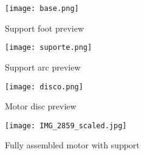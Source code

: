 \begin{figure}[htp]
	\centering
	\texttt{[image: base.png]}
	\caption{Support foot preview}
	\label{fig:support_base}
\end{figure}
\begin{figure}[htp]
	\centering
	\texttt{[image: suporte.png]}
	\caption{Support arc preview}
	\label{fig:support_arc}
\end{figure}
\begin{figure}[htp]
	\centering
	\texttt{[image: disco.png]}
	\caption{Motor disc preview}
	\label{fig:support_disc}
\end{figure}
\begin{figure}[htp]
	\centering
	\texttt{[image: IMG\_2859\_scaled.jpg]}
	\caption{Fully assembled motor with support}
	\label{fig:final_motor_stage}
\end{figure}

